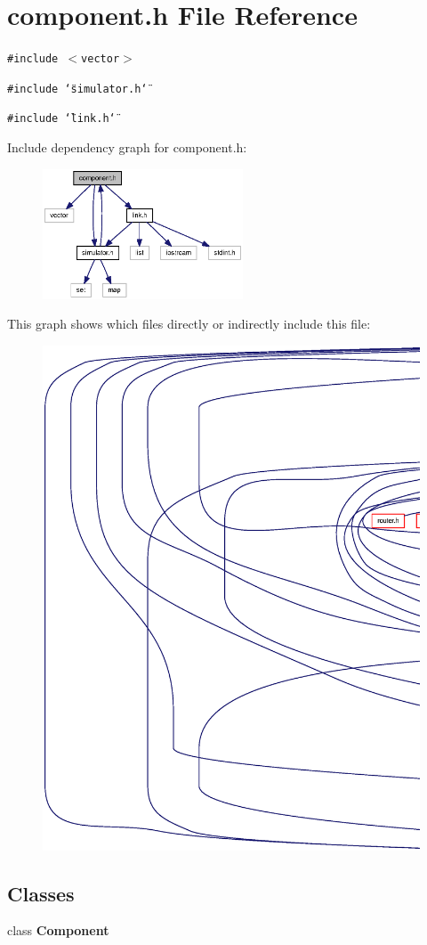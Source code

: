\section{component.h File Reference}
\label{component_8h}
{\tt \#include $<$vector$>$}\par
{\tt \#include \char`\"{}simulator.h\char`\"{}}\par
{\tt \#include \char`\"{}link.h\char`\"{}}\par


Include dependency graph for component.h:\nopagebreak
\begin{figure}[H]
\begin{center}
\leavevmode
\includegraphics[width=169pt]{component_8h__incl}
\end{center}
\end{figure}


This graph shows which files directly or indirectly include this file:\nopagebreak
\begin{figure}[H]
\begin{center}
\leavevmode
\includegraphics[width=420pt]{component_8h__dep__incl}
\end{center}
\end{figure}
\subsection*{Classes}
\begin{CompactItemize}
\item 
class {\bf Component}
\end{CompactItemize}
